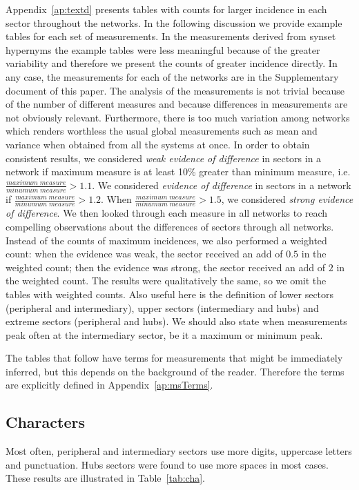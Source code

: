 \documentclass[review]{elsarticle}
\begin{document}
Appendix~\ref{ap:textd} presents tables with counts for larger incidence in each sector throughout the networks. In the following discussion we provide example tables for each set of measurements.
In the measurements derived from synset hypernyms the example tables were less meaningful because of the greater variability and therefore we present the counts of greater incidence directly.
In any case, the measurements for each of the networks are in the Supplementary document of this paper.
The analysis of the measurements
is not trivial because of the number of different measures
and because differences in measurements are not obviously relevant.
Furthermore, there is too much variation among networks
which renders worthless the usual global measurements such as mean and variance when obtained from all the systems at once.
In order to obtain consistent results, we considered \emph{weak evidence of difference} in sectors in a network
if maximum measure is at least 10\% greater than minimum measure,
i.e. $\frac{maximum\;measure}{minumum\;measure}>1.1$.
We considered \emph{evidence of difference} in sectors in a network if
$\frac{maximum\;measure}{minumum\;measure}>1.2$.
When 
$\frac{maximum\;measure}{minumum\;measure}>1.5$, we considered \emph{strong evidence of difference}.
We then looked through each measure in all networks to reach compelling observations about the
differences of sectors through all networks.
Instead of the counts of maximum incidences, we also performed a weighted count:
when the evidence was weak, the sector received an add of $0.5$ in the weighted count;
then the evidence was strong, the sector received an add of $2$ in the weighted count.
The results were qualitatively the same, so we omit the tables with weighted counts.
Also useful here is the definition of lower sectors (peripheral and intermediary),
upper sectors (intermediary and hubs) and extreme sectors (peripheral and hubs).
We should also state when measurements peak often at the intermediary sector,
be it a maximum or minimum peak.

The tables that follow have terms for measurements that might be immediately inferred,
but this depends on the background of the reader.
Therefore the terms are explicitly defined in Appendix~\ref{ap:msTerms}.

\subsection{Characters}\label{sec:cha}
Most often, peripheral and intermediary sectors use more digits, uppercase letters and punctuation.
Hubs sectors were found to use more spaces in most cases. 
These results are illustrated in Table~\ref{tab:cha}.

\FloatBarrier
\end{document}
